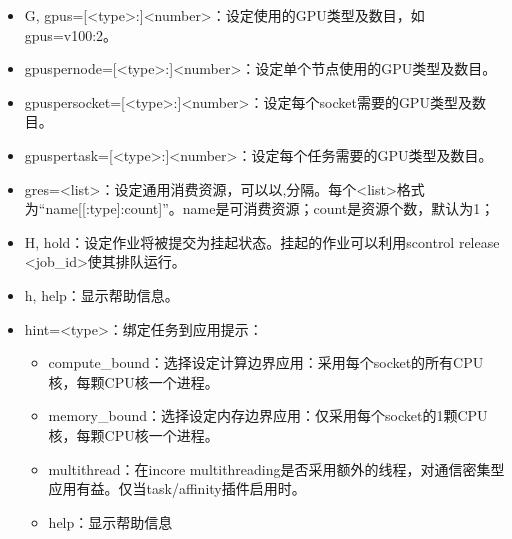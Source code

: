 \documentclass[a4paper,12pt,english]{sphinxmanual}
\begin{document}
\begin{itemize}
\item {} 
\sphinxAtStartPar
\sphinxhyphen{}G, \sphinxhyphen{}\sphinxhyphen{}gpus={[}<type>:{]}<number>：设定使用的GPU类型及数目，如\sphinxhyphen{}\sphinxhyphen{}gpus=v100:2。

\item {} 
\sphinxAtStartPar
\sphinxhyphen{}\sphinxhyphen{}gpus\sphinxhyphen{}per\sphinxhyphen{}node={[}<type>:{]}<number>：设定单个节点使用的GPU类型及数目。

\item {} 
\sphinxAtStartPar
\sphinxhyphen{}\sphinxhyphen{}gpus\sphinxhyphen{}per\sphinxhyphen{}socket={[}<type>:{]}<number>：设定每个socket需要的GPU类型及数目。

\item {} 
\sphinxAtStartPar
\sphinxhyphen{}\sphinxhyphen{}gpus\sphinxhyphen{}per\sphinxhyphen{}task={[}<type>:{]}<number>：设定每个任务需要的GPU类型及数目。

\item {} 
\sphinxAtStartPar
\sphinxhyphen{}\sphinxhyphen{}gres=<list>：设定通用消费资源，可以以,分隔。每个<list>格式为“name{[}{[}:type{]}:count{]}”。name是可消费资源；count是资源个数，默认为1；

\item {} 
\sphinxAtStartPar
\sphinxhyphen{}H, \sphinxhyphen{}\sphinxhyphen{}hold：设定作业将被提交为挂起状态。挂起的作业可以利用scontrol release <job\_id>使其排队运行。

\item {} 
\sphinxAtStartPar
\sphinxhyphen{}h, \sphinxhyphen{}\sphinxhyphen{}help：显示帮助信息。

\item {} 
\sphinxAtStartPar
\sphinxhyphen{}\sphinxhyphen{}hint=<type>：绑定任务到应用提示：
\begin{itemize}
\item {} 
\sphinxAtStartPar
compute\_bound：选择设定计算边界应用：采用每个socket的所有CPU核，每颗CPU核一个进程。

\item {} 
\sphinxAtStartPar
memory\_bound：选择设定内存边界应用：仅采用每个socket的1颗CPU核，每颗CPU核一个进程。

\item {} 
\sphinxAtStartPar
multithread：在in\sphinxhyphen{}core multi\sphinxhyphen{}threading是否采用额外的线程，对通信密集型应用有益。仅当task/affinity插件启用时。

\item {} 
\sphinxAtStartPar
help：显示帮助信息


\end{itemize}
\end{itemize}
\end{document}
